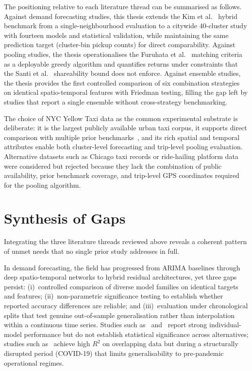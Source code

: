 The positioning relative to each literature thread can be summarised as follows. Against demand forecasting studies, this thesis extends the Kim et al.~\parencite{kim2020hybrid} hybrid benchmark from a single-neighbourhood evaluation to a citywide 40-cluster study with fourteen models and statistical validation, while maintaining the same prediction target (cluster-bin pickup counts) for direct comparability. Against pooling studies, the thesis operationalises the Furuhata et al.~\parencite{furuhata2013ridesharing} matching criteria as a deployable greedy algorithm and quantifies returns under constraints that the Santi et al.~\parencite{santi2014quantifying} shareability bound does not enforce. Against ensemble studies, the thesis provides the first controlled comparison of six combination strategies on identical spatio-temporal features with Friedman testing, filling the gap left by studies that report a single ensemble without cross-strategy benchmarking.

The choice of NYC Yellow Taxi data as the common experimental substrate is deliberate: it is the largest publicly available urban taxi corpus, it supports direct comparison with multiple prior benchmarks~\parencite{kim2020hybrid,xu2017realtime,liu2021epidemic,santi2014quantifying}, and its rich spatial and temporal attributes enable both cluster-level forecasting and trip-level pooling evaluation. Alternative datasets such as Chicago taxi records or ride-hailing platform data were considered but rejected because they lack the combination of public availability, prior benchmark coverage, and trip-level GPS coordinates required for the pooling algorithm.

\section{Synthesis of Gaps}

Integrating the three literature threads reviewed above reveals a coherent pattern of unmet needs that no single prior study addresses in full.

In demand forecasting, the field has progressed from ARIMA baselines through deep spatio-temporal networks to hybrid residual architectures, yet three gaps persist: (i)~controlled comparison of diverse model families on identical targets and features; (ii)~non-parametric significance testing to establish whether reported accuracy differences are reliable; and (iii)~evaluation under chronological splits that test genuine out-of-sample generalisation rather than interpolation within a continuous time series. Studies such as~\parencite{kim2020hybrid} and~\parencite{xu2017realtime} report strong individual-model performance but do not establish statistical significance across alternatives; studies such as~\parencite{liu2021epidemic} achieve high $R^2$ on overlapping data but during a structurally disrupted period (COVID-19) that limits generalisability to pre-pandemic operational regimes.

